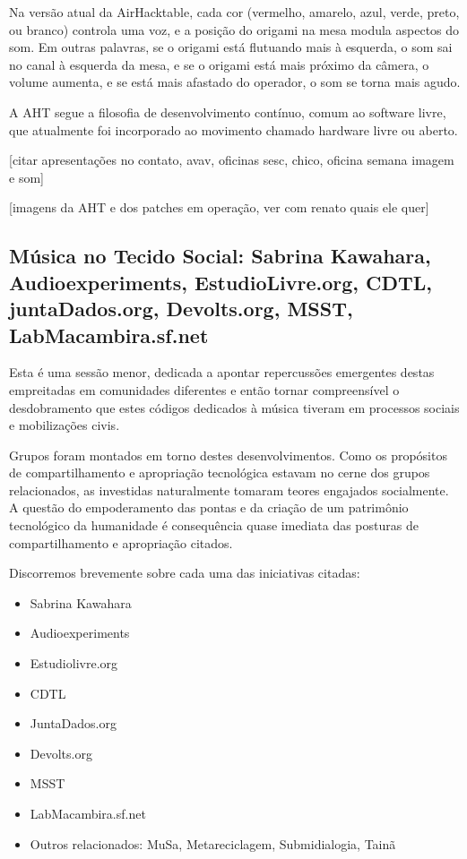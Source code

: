 Na versão atual da AirHacktable, cada cor (vermelho, amarelo, azul,
verde, preto, ou branco) controla uma voz, e a posição do origami na
mesa modula aspectos do som. Em outras palavras, se o origami está
flutuando mais à esquerda, o som sai no canal à esquerda da mesa, e se
o origami está mais próximo da câmera, o volume aumenta, e se está
mais afastado do operador, o som se torna mais agudo.

A AHT segue a filosofia de desenvolvimento contínuo, comum ao software
livre, que atualmente foi incorporado ao movimento chamado hardware
livre ou aberto.

[citar apresentações no contato, avav, oficinas sesc, chico, oficina semana imagem e som]

[imagens da AHT e dos patches em operação, ver com renato quais ele quer]

\subsection{Música no Tecido Social: Sabrina Kawahara, Audioexperiments, EstudioLivre.org, CDTL, juntaDados.org, Devolts.org, MSST, LabMacambira.sf.net}

Esta é uma sessão menor, dedicada a apontar repercussões emergentes
destas empreitadas em comunidades diferentes e então tornar
compreensível o desdobramento que estes códigos dedicados à música
tiveram em processos sociais e mobilizações civis.

Grupos foram montados em torno destes desenvolvimentos. Como os
propósitos de compartilhamento e apropriação tecnológica estavam no
cerne dos grupos relacionados, as investidas naturalmente tomaram
teores engajados socialmente. A questão do empoderamento das pontas e
da criação de um patrimônio tecnológico da humanidade é consequência
quase imediata das posturas de compartilhamento e apropriação citados.

Discorremos brevemente sobre cada uma das iniciativas citadas:

\begin{itemize}
    \item Sabrina Kawahara
    \item Audioexperiments
    \item Estudiolivre.org
    \item CDTL
    \item JuntaDados.org
    \item Devolts.org
    \item MSST
    \item LabMacambira.sf.net
    \item Outros relacionados: MuSa, Metareciclagem, Submidialogia, Tainã
\end{itemize}

